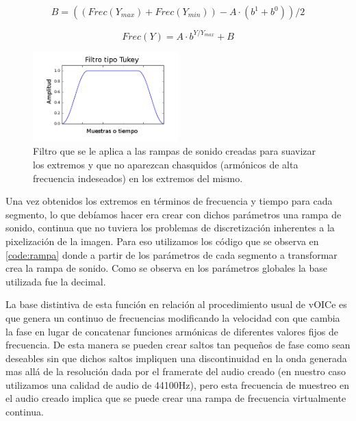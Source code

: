 \documentclass{article}
\begin{document}
    \begin{equation}
        \label{ec:yToF2}
        B = ((Frec(Y_{max}) + Frec(Y_{min})) - A \cdot (b^1 + b^0)) / 2
    \end{equation}
    
    \begin{equation}
        \label{ec:yToF3}
        Frec(Y) = A \cdot b^{Y/Y_{max}} + B
    \end{equation}
    
    \begin{figure}
        \center
        \includegraphics[width=0.5\textwidth]{Imagenes/tukey.png}
        \caption{Filtro que se le aplica a las rampas de sonido creadas para suavizar los extremos y que no aparezcan chasquidos (armónicos de alta frecuencia indeseados) en los extremos del mismo.}
        \label{fig:tukey}
    \end{figure}
    
    Una vez obtenidos los extremos en términos de frecuencia y tiempo para cada segmento, lo que debíamos hacer era crear con dichos parámetros una rampa de sonido, continua que no tuviera los problemas de discretización inherentes a la pixelización de la imagen. Para eso utilizamos los código que se observa en \ref{code:rampa} donde a partir de los parámetros de cada segmento a transformar crea la rampa de sonido. Como se observa en los parámetros globales la base utilizada fue la decimal. 
    
    La base distintiva de esta función en relación al procedimiento usual de vOICe es que genera un continuo de frecuencias modificando la velocidad con que cambia la fase en lugar de concatenar funciones armónicas de diferentes valores fijos de frecuencia. De esta manera se pueden crear saltos tan pequeños de fase como sean deseables sin que dichos saltos impliquen una discontinuidad en la onda generada mas allá de la resolución dada por el framerate del audio creado (en nuestro caso utilizamos una calidad de audio de 44100Hz), pero esta frecuencia de muestreo en el audio creado implica que se puede crear una rampa de frecuencia virtualmente continua. 
    
\end{document}
